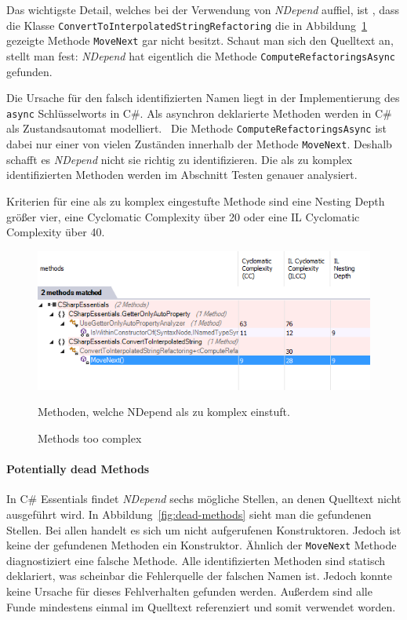 Das wichtigste Detail, welches bei der Verwendung von \emph{NDepend} auffiel, ist , dass die Klasse \texttt{ConvertToInterpolatedStringRefactoring} die in Abbildung~\ref{fig:nd-methode-too-complex} gezeigte Methode \texttt{MoveNext} gar nicht besitzt. Schaut man sich den Quelltext an, stellt man fest: \emph{NDepend} hat eigentlich die Methode \texttt{ComputeRefactoringsAsync} gefunden.

Die Ursache für den falsch identifizierten Namen liegt in der Implementierung des \texttt{async} Schlüsselworts in C\#. Als asynchron deklarierte Methoden werden in C\# als Zustandsautomat modelliert.~\cite{csharp-async} Die Methode \texttt{ComputeRefactoringsAsync} ist dabei nur einer von vielen Zuständen innerhalb der Methode \texttt{MoveNext}. Deshalb schafft es \emph{NDepend} nicht sie richtig zu identifizieren. Die als zu komplex identifizierten Methoden werden im Abschnitt Testen genauer analysiert.

Kriterien für eine als zu komplex eingestufte Methode sind eine Nesting Depth größer vier, eine Cyclomatic Complexity über 20 oder eine IL Cyclomatic Complexity über 40.~\cite{nd-cc-criteria}

\begin{figure}[!ht]
	\centering
	\includegraphics[width=\textwidth]{images/methode-too-complex.png}
	\caption{Methods too complex}
	\vspace{0.1cm}
	Methoden, welche NDepend als zu komplex einstuft.
	\label{fig:nd-methode-too-complex}
\end{figure}

\paragraph{Potentially dead Methods} In C\# Essentials findet \emph{NDepend} sechs mögliche Stellen, an denen Quelltext nicht ausgeführt wird. In Abbildung~\ref{fig:dead-methods} sieht man die gefundenen Stellen. Bei allen handelt es sich um nicht aufgerufenen Konstruktoren. Jedoch ist keine der gefundenen Methoden ein Konstruktor. Ähnlich der \texttt{MoveNext} Methode diagnostiziert eine falsche Methode. Alle identifizierten Methoden sind statisch deklariert, was scheinbar die Fehlerquelle der falschen Namen ist. Jedoch konnte keine Ursache für dieses Fehlverhalten gefunden werden. Außerdem sind alle Funde mindestens einmal im Quelltext referenziert und somit verwendet worden.

